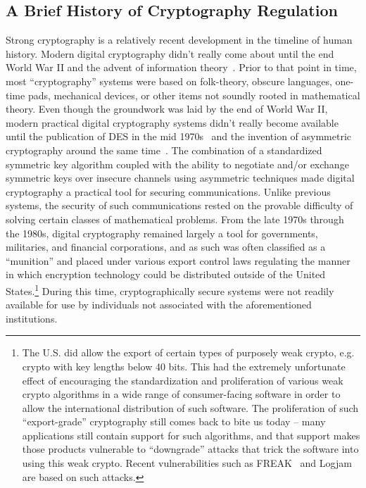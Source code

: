 \subsection{A Brief History of Cryptography Regulation}

Strong cryptography is a relatively recent development in the timeline
of human history. Modern digital cryptography didn't really come about
until the end World War II and the advent of information
theory~\cite{shannon1945}. Prior to that point in time, most
``cryptography'' systems were based on folk-theory, obscure languages,
one-time pads, mechanical devices, or other items not soundly rooted
in mathematical theory. Even though the groundwork was laid by the end
of World War II, modern practical digital cryptography systems didn't
really become available until the publication of DES in the mid
1970s~\cite{fips46} and the invention of asymmetric cryptography
around the same time~\cite{diffie1976}. The combination of a
standardized symmetric key algorithm coupled with the ability to
negotiate and/or exchange symmetric keys over insecure channels using
asymmetric techniques made digital cryptography a practical tool for
securing communications. Unlike previous systems, the security of such
communications rested on the provable difficulty of solving certain
classes of mathematical problems. From the late 1970s through the
1980s, digital cryptography remained largely a tool for governments,
militaries, and financial corporations, and as such was often
classified as a ``munition'' and placed under various export control
laws regulating the manner in which encryption technology could be
distributed outside of the United States.\footnote{The U.S. did allow
  the export of certain types of purposely weak crypto, e.g. crypto
  with key lengths below 40 bits. This had the extremely unfortunate
  effect of encouraging the standardization and proliferation of
  various weak crypto algorithms in a wide range of consumer-facing
  software in order to allow the international distribution of such
  software. The proliferation of such ``export-grade'' cryptography
  still comes back to bite us today -- many applications still contain
  support for such algorithms, and that support makes those products
  vulnerable to ``downgrade'' attacks that trick the software into
  using this weak crypto. Recent vulnerabilities such as
  FREAK~\cite{beurdouche2015} and Logjam~\cite{adrian2015} are based
  on such attacks.} During this time, cryptographically secure systems
were not readily available for use by individuals not associated with
the aforementioned institutions.

